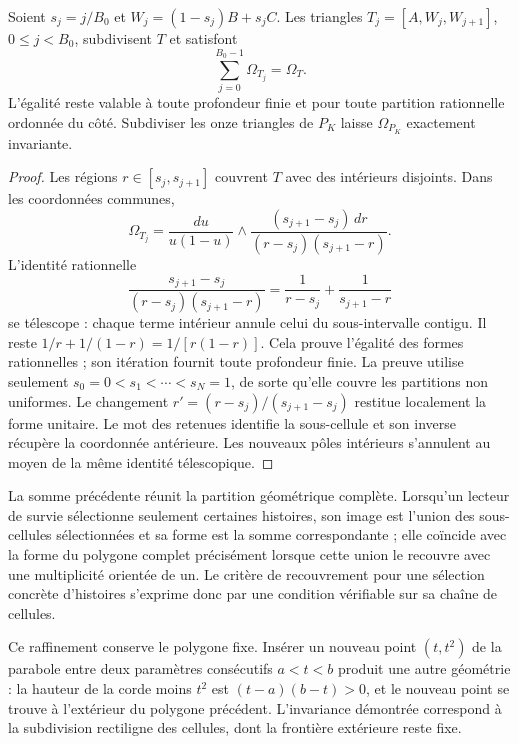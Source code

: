 \begin{theorem}
\label{thm:polygon-carry}
Soient \(s_j=j/B_0\) et \(W_j=(1-s_j)B+s_jC\).
Les triangles \(T_j=[A,W_j,W_{j+1}]\), \(0\leq j<B_0\), subdivisent
\(T\) et satisfont
\begin{equation}
 \sum_{j=0}^{B_0-1}\Omega_{T_j}=\Omega_T.
 \label{eq:polygon-carry-additivity}
\end{equation}
L'égalité reste valable à toute profondeur finie et pour toute partition rationnelle ordonnée du côté. Subdiviser les onze triangles de \(P_K\) laisse \(\Omega_{P_K}\) exactement invariante.
\end{theorem}
\begin{proof}
Les régions \(r\in[s_j,s_{j+1}]\) couvrent \(T\) avec des intérieurs disjoints.
Dans les coordonnées communes,
\[
 \Omega_{T_j}=\frac{du}{u(1-u)}\wedge
 \frac{(s_{j+1}-s_j)\,dr}{(r-s_j)(s_{j+1}-r)}.
\]
L’identité rationnelle
\[
 \frac{s_{j+1}-s_j}{(r-s_j)(s_{j+1}-r)}
 =\frac1{r-s_j}+\frac1{s_{j+1}-r}
\]
se télescope : chaque terme intérieur annule celui du sous-intervalle contigu.
Il reste \(1/r+1/(1-r)=1/[r(1-r)]\). Cela prouve l’égalité des formes
rationnelles ; son itération fournit toute profondeur finie.
La preuve utilise seulement \(s_0=0<s_1<\cdots<s_N=1\), de sorte qu’elle couvre
les partitions non uniformes. Le changement
\(r'=(r-s_j)/(s_{j+1}-s_j)\) restitue localement la forme unitaire.
Le mot des retenues identifie la sous-cellule et son inverse récupère la
coordonnée antérieure. Les nouveaux pôles intérieurs s’annulent au moyen de
la même identité télescopique.
\end{proof}

La somme précédente réunit la partition géométrique complète. Lorsqu’un lecteur
de survie sélectionne seulement certaines histoires, son image est l’union
des sous-cellules sélectionnées et sa forme est la somme correspondante ;
elle coïncide avec la forme du polygone complet précisément lorsque cette union
le recouvre avec une multiplicité orientée de un. Le critère de
recouvrement pour une sélection concrète d’histoires s’exprime donc par
une condition vérifiable sur sa chaîne de cellules.

Ce raffinement conserve le polygone fixe. Insérer un nouveau point \((t,t^2)\) de la parabole entre deux paramètres consécutifs \(a<t<b\) produit une autre géométrie : la hauteur de la corde moins \(t^2\) est \((t-a)(b-t)>0\), et le nouveau point se trouve à l'extérieur du polygone précédent. L'invariance démontrée correspond à la subdivision rectiligne des cellules, dont la frontière extérieure reste fixe.


